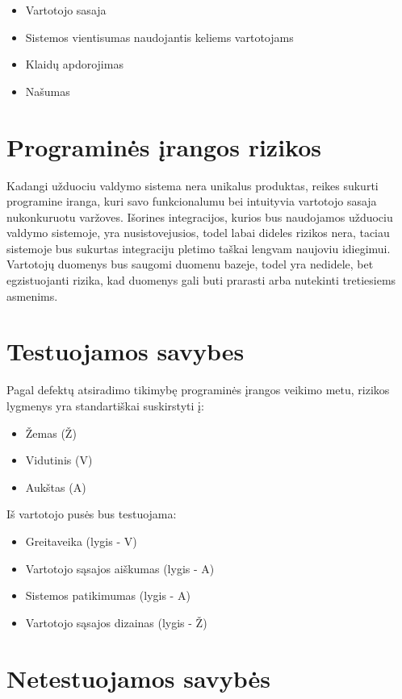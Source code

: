 \documentclass{VUMIFPSkursinis}
\begin{document}
\begin{itemize}
	\item Vartotojo sasaja
	\item Sistemos vientisumas naudojantis keliems vartotojams
	\item Klaidų apdorojimas
	\item Našumas
\end{itemize}


\section{Programinės įrangos rizikos}

Kadangi užduociu valdymo sistema nera unikalus produktas, reikes sukurti programine iranga,
kuri savo funkcionalumu bei intuityvia vartotojo sasaja nukonkuruotu varžoves.
Išorines integracijos, kurios bus naudojamos užduociu valdymo sistemoje, yra nusistovejusios, todel labai dideles
rizikos nera, taciau sistemoje bus sukurtas integraciju pletimo taškai lengvam naujoviu idiegimui.
Vartotojų duomenys bus saugomi duomenu bazeje, todel yra nedidele, bet egzistuojanti rizika, kad duomenys gali buti
prarasti arba nutekinti tretiesiems asmenims.


\section{Testuojamos savybes}

Pagal defektų atsiradimo tikimybę programinės įrangos veikimo metu, rizikos lygmenys yra standartiškai suskirstyti į:

\begin{itemize}
	\item Žemas (Ž)
	\item Vidutinis (V)
	\item Aukštas (A)
\end{itemize}

Iš vartotojo pusės bus testuojama:

\begin{itemize}
	\item Greitaveika (lygis - V)
	\item Vartotojo sąsajos aiškumas (lygis - A)
	\item Sistemos patikimumas (lygis - A)
	\item Vartotojo sąsajos dizainas (lygis - Ž)
\end{itemize}


\section{Netestuojamos savybės}
\end{document}
